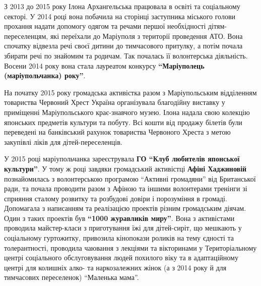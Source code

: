 

З 2013 до 2015 року Ілона Архангельська працювала в освіті та соціальному
секторі. У 2014 році вона побачила на сторінці заступника міського голови
прохання надати допомогу одягом та речами першої необхідності
дітям-переселенцям, які переїхали до Маріуполя з території проведення АТО. Вона
спочатку відвезла речі своєї дитини до тимчасового притулку, а потім почала
збирати речі по знайомим та родичам. Так почалась її волонтерська діяльність.
Восени 2014 року вона стала лауреатом конкурсу \textbf{\enquote{Маріуполець (маріупольчанка)
року}}.


На початку 2015 року громадська активістка разом з Маріупольським відділенням
товариства Червоний Хрест Україна організувала благодійну виставку у приміщенні
Маріупольського крає\hyp{}знавчого музею. Ілона надала свою колекцію японських
предметів культури та побуту. Всі кошти від продажу білетів були переведені на
банківський рахунок товариства Червоного Хреста з метою закупівлі ліків для
дітей-переселенців.


У 2015 році маріупольчанка зареєструвала \textbf{ГО \enquote{Клуб любителів японської
культури}}. У тому ж році завдяки громадський активістці \textbf{Афіні Хаджиновій}
познайомилась з волонтерською програмою \enquote{Активні громадяни} від Британської
ради, та почала проводити разом з Афіною та іншими волонтерами тренінги зі
сприяння сталому розвитку та розбудові довіри і порозуміння в громаді.
Допомагала з написанням та реалізацією проектів різним громадським діячам. Один
з таких проектів був \textbf{\enquote{1000 журавликів миру}}. Вона з активістами проводила
майстер-класи з приготування їжі для дітей-сиріт, що мешкають у соціальному
гуртожитку, привозила кінопокази роликів на тему єдності та толерантності,
проводила чаювання з лекціями та вікторинами у Територіальному центрі
соціального обслуговування людей похилого віку та в адаптаційному центрі для
колишніх алко- та наркозалежних жінок (а з 2014 року й для тимчасових
переселенок) \enquote{Маленька мама}.


